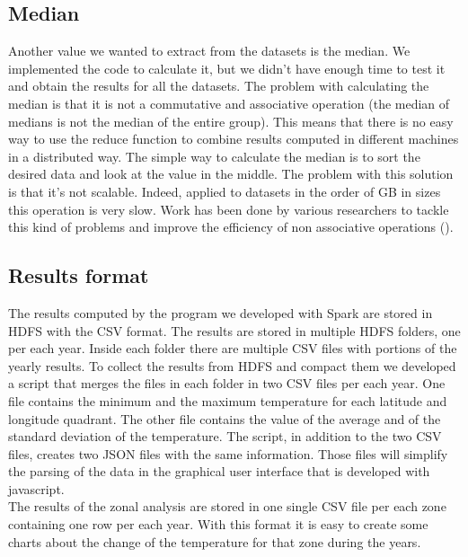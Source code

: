 \documentclass{vldb}
\begin{document}
\subsection{Median}
Another value we wanted to extract from the datasets is the median. We implemented the code to calculate it, but we didn't have enough time to test it and obtain the results for all the datasets. The problem with calculating the median is that it is not a commutative and associative operation (the median of medians is not the median of the entire group). This means that there is no easy way to use the reduce function to combine results computed in different machines in a distributed way. The simple way to calculate the median is to sort the desired data and look at the value in the middle. The problem with this solution is that it's not scalable. Indeed, applied to datasets in the order of GB in sizes this operation is very slow. Work has been done by various researchers to tackle this kind of problems and improve the efficiency of non associative operations (\cite{liu2009computing}).

\subsection{Results format}
The results computed by the program we developed with Spark are stored in HDFS with the CSV format. The results are stored in multiple HDFS folders, one per each year. Inside each folder there are multiple CSV files with portions of the yearly results. To collect the results from HDFS and compact them we developed a script that merges the files in each folder in two CSV files per each year. One file contains the minimum and the maximum temperature for each latitude and longitude quadrant. The other file contains the value of the average and of the standard deviation of the temperature.
The script, in addition to the two CSV files, creates two JSON files with the same information. Those files will simplify the parsing of the data in the graphical user interface that is developed with javascript. 
\\ The results of the zonal analysis are stored in one single CSV file per each zone containing one row per each year. With this format it is easy to create some charts about the change of the temperature for that zone during the years.
\end{document}
